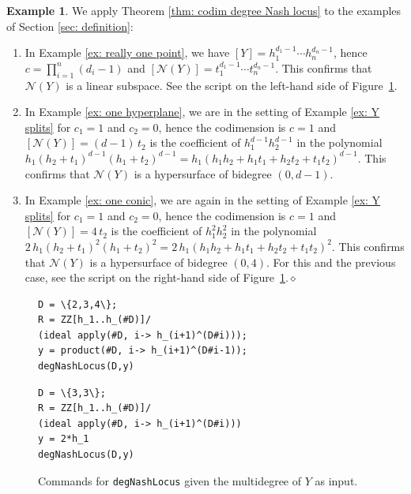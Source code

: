 \documentclass[12pt]{article}
\theoremstyle{definition}
\newtheorem{exampletwo}[theorem]{Example}
\newcommand{\kn}{{\mathcal N}}
\begin{document}
\begin{exampletwo}
We apply Theorem \ref{thm: codim degree Nash locus} to the  examples of Section \ref{sec: definition}:
\begin{enumerate}
    \item In Example \ref{ex: really one point}, we have $[Y]=h_1^{d_1-1}\cdots h_n^{d_n-1}$, hence $c=\prod_{i=1}^n(d_i-1)$ and $[\kn(Y)]=t_1^{d_1-1}\cdots t_n^{d_n-1}$.
    This confirms that $\kn(Y)$ is a linear subspace. See the script on the left-hand side of Figure~\ref{fig: degNashLocus}.
    \item In Example \ref{ex: one hyperplane}, we are in the setting of Example \ref{ex: Y splits} for $c_1=1$ and $c_2=0$, hence the codimension is $c=1$ and $[\kn(Y)]=(d-1)\,t_2$ is the coefficient of $h_1^{d-1}h_2^{d-1}$ in the polynomial $h_1(h_2+t_1)^{d-1}(h_1+t_2)^{d-1}=h_1(h_1h_2+h_1t_1+h_2t_2+t_1t_2)^{d-1}$. This confirms that $\kn(Y)$ is a hypersurface of bidegree $(0,d-1)$.
    \item In Example \ref{ex: one conic}, we are again in the setting of Example \ref{ex: Y splits} for $c_1=1$ and $c_2=0$, hence the codimension is $c=1$ and $[\kn(Y)]=4\,t_2$ is the coefficient of $h_1^2h_2^2$ in the polynomial $2\,h_1(h_2+t_1)^2(h_1+t_2)^2=2\,h_1(h_1h_2+h_1t_1+h_2t_2+t_1t_2)^2$. This confirms that $\kn(Y)$ is a hypersurface of bidegree $(0,4)$. For this and the previous case, see the script on the right-hand side of Figure~\ref{fig: degNashLocus}.\hfill$\diamond$
\end{enumerate}
\end{exampletwo}

\begin{figure}[h]
\centering
\begin{minipage}{0.48\textwidth}
\begin{tcolorbox}[size=fbox,width=\linewidth,colback=blue!5!white,colframe=blue!75!black]
\begin{Verbatim}[fontsize=\small,commandchars=\\\{\}]
D = \{2,3,4\};
R = ZZ[h_1..h_(#D)]/
(ideal apply(#D, i-> h_(i+1)^(D#i)));
y = product(#D, i-> h_(i+1)^(D#i-1));
degNashLocus(D,y)
\end{Verbatim}
\end{tcolorbox}
\end{minipage}
\begin{minipage}{0.48\textwidth}
\begin{tcolorbox}[size=fbox,width=\linewidth,colback=blue!5!white,colframe=blue!75!black]
\begin{Verbatim}[fontsize=\small,commandchars=\\\{\}]
D = \{3,3\};
R = ZZ[h_1..h_(#D)]/
(ideal apply(#D, i-> h_(i+1)^(D#i)))
y = 2*h_1
degNashLocus(D,y)
\end{Verbatim}
\end{tcolorbox}
\end{minipage}
\caption{Commands for {\tt degNashLocus} given the multidegree of $Y$ as input.}\label{fig: degNashLocus}
\end{figure}
\end{document}
